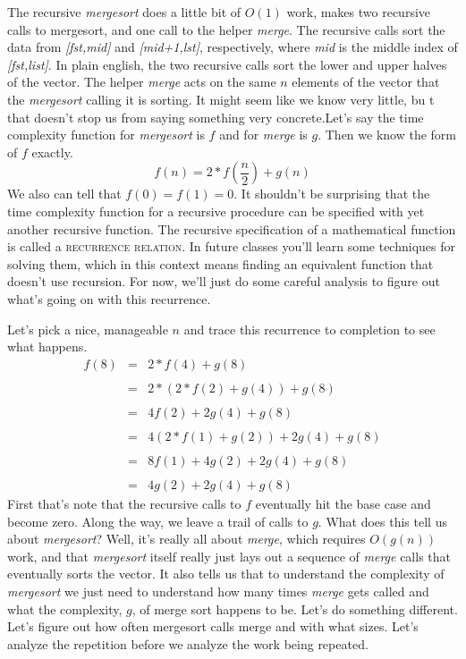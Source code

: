 \documentclass[]{tufte-handout}
\begin{document}
The recursive \textit{mergesort} does a little bit of $O(1)$ work, makes two recursive calls to mergesort, and one call to the helper \textit{merge}. The recursive calls sort the data from \textit{[fst,mid]} and \textit{[mid+1,lst]}, respectively, where \textit{mid} is the middle index of \textit{[fst,list]}. In plain english, the two recursive calls sort the lower and upper halves of the vector. The helper \textit{merge} acts on the same $n$ elements of the vector that the \textit{mergesort} calling it is sorting.  It might seem like we know very little, bu t that doesn't stop us from saying something very concrete.Let's say the time complexity function for \textit{mergesort} is $f$ and for \textit{merge} is $g$. Then we know the form of $f$ exactly.
\[
f(n) = 2*f(\dfrac{n}{2}) + g(n)
\]
We also can tell that $f(0)=f(1)=0$. It shouldn't be surprising that the time complexity function for a recursive procedure can be specified with yet another recursive function.  The recursive specification of a mathematical function is called a \textsc{recurrence relation}. In future classes you'll learn some techniques for solving them, which in this context means finding an equivalent function that doesn't use recursion. For now, we'll just do some careful analysis to figure out what's going on with this recurrence. 

Let's pick a nice, manageable $n$ and trace this recurrence to completion to see what happens. 
\[
\begin{array}{rcl}
f(8) &=& 2*f(4) + g(8) \\ \\ 
&=& 2*(2*f(2) + g(4)) + g(8)  \\ \\
&=& 4f(2) + 2g(4) + g(8) \\ \\ 
&=& 4(2*f(1)+g(2)) + 2g(4) + g(8) \\ \\ 
&=& 8f(1) + 4g(2) + 2g(4) + g(8) \\ \\ 
&=& 4g(2) + 2g(4) + g(8) 
\end{array}
\]
First that's note that the recursive calls to $f$ eventually hit the base case and become zero.  Along the way, we leave a trail of calls to $g$. What does this tell us about \textit{mergesort}?  Well, it's really all about \textit{merge}, which requires $O(g(n))$ work, and that \textit{mergesort} itself really just lays out a sequence of \textit{merge} calls that eventually sorts the vector. It also tells us that to understand the complexity of \textit{mergesort} we just need to understand how many times \textit{merge} gets called and what the complexity, $g$, of merge sort happens to be. Let's do something different. Let's figure out how often mergesort calls merge and with what sizes. Let's analyze the repetition before we analyze the work being repeated. 
\end{document}
